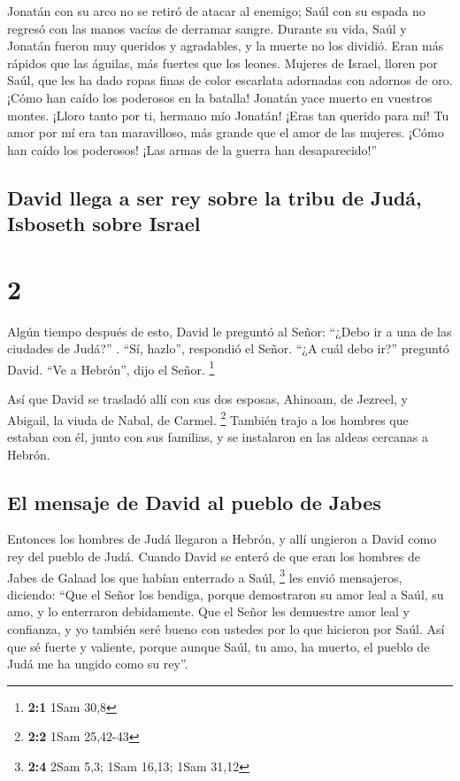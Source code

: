 Jonatán con su arco no se retiró de atacar al enemigo;
Saúl con su espada no regresó con las manos vacías de derramar sangre.
 Durante su vida, Saúl y Jonatán fueron muy queridos y
agradables, y la muerte no los dividió. Eran más rápidos que las
águilas, más fuertes que los leones.  Mujeres de Israel,
lloren por Saúl, que les ha dado ropas finas de color escarlata
adornadas con adornos de oro.  ¡Cómo han caído los
poderosos en la batalla! Jonatán yace muerto en vuestros montes.
 ¡Lloro tanto por ti, hermano mío Jonatán! ¡Eras tan
querido para mí! Tu amor por mí era tan maravilloso, más grande que el
amor de las mujeres.  ¡Cómo han caído los poderosos! ¡Las
armas de la guerra han desaparecido!''

\hypertarget{david-llega-a-ser-rey-sobre-la-tribu-de-juduxe1-isboseth-sobre-israel}{%
\subsection{David llega a ser rey sobre la tribu de Judá, Isboseth sobre
Israel}\label{david-llega-a-ser-rey-sobre-la-tribu-de-juduxe1-isboseth-sobre-israel}}

\hypertarget{section-1}{%
\section{2}\label{section-1}}

 Algún tiempo después de esto, David le preguntó al Señor:
``¿Debo ir a una de las ciudades de Judá?'' . ``Sí, hazlo'', respondió
el Señor. ``¿A cuál debo ir?'' preguntó David. ``Ve a Hebrón'', dijo el
Señor. \footnote{\textbf{2:1} 1Sam 30,8}

 Así que David se trasladó allí con sus dos esposas,
Ahinoam, de Jezreel, y Abigail, la viuda de Nabal, de Carmel.
\footnote{\textbf{2:2} 1Sam 25,42-43}  También trajo a los
hombres que estaban con él, junto con sus familias, y se instalaron en
las aldeas cercanas a Hebrón.

\hypertarget{el-mensaje-de-david-al-pueblo-de-jabes}{%
\subsection{El mensaje de David al pueblo de
Jabes}\label{el-mensaje-de-david-al-pueblo-de-jabes}}

 Entonces los hombres de Judá llegaron a Hebrón, y allí
ungieron a David como rey del pueblo de Judá. Cuando David se enteró de
que eran los hombres de Jabes de Galaad los que habían enterrado a Saúl,
\footnote{\textbf{2:4} 2Sam 5,3; 1Sam 16,13; 1Sam 31,12} 
les envió mensajeros, diciendo: ``Que el Señor los bendiga, porque
demostraron su amor leal a Saúl, su amo, y lo enterraron debidamente.
 Que el Señor les demuestre amor leal y confianza, y yo
también seré bueno con ustedes por lo que hicieron por Saúl.
 Así que sé fuerte y valiente, porque aunque Saúl, tu amo,
ha muerto, el pueblo de Judá me ha ungido como su rey''.

